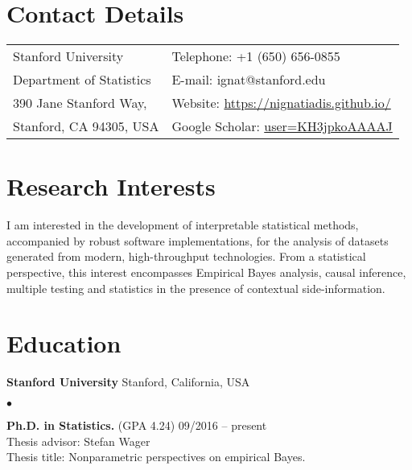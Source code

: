 \documentclass[margin,line]{res}
\newenvironment{list2}{
  \begin{list}{$\bullet$}{%
      \setlength{\itemsep}{0in}
      \setlength{\parsep}{0in} \setlength{\parskip}{0in}
      \setlength{\topsep}{0in} \setlength{\partopsep}{0in}
      \setlength{\leftmargin}{0.2in}}}{\end{list}}
\begin{document}

\begin{resume}
\section{\sc Contact Details}
\vspace{.05in}
\begin{tabular}{@{}p{2in}p{4in}}
Stanford University             & {Telephone:}  +1 (650) 656-0855 \\
Department of Statistics   & {E-mail:}    ignat@stanford.edu \\
390 Jane Stanford Way, &  {Website:} \href{https://nignatiadis.github.io/}{https://nignatiadis.github.io/}\\
Stanford, CA 94305, USA  & {Google Scholar:} \href{https://scholar.google.com/citations?user=KH3jpkoAAAAJ}{user=KH3jpkoAAAAJ} \\
\end{tabular}



\section{\sc Research Interests}
I am interested in the development of interpretable statistical methods, accompanied by robust software implementations, for the analysis of datasets generated from modern, high-throughput technologies. From a statistical perspective, this interest encompasses Empirical Bayes analysis, causal inference, multiple testing and statistics in the presence of contextual side-information.

\section{\sc Education}
{\bf Stanford University} \hfill Stanford, California, USA\\
\vspace*{-.14in}
\begin{list2}
\item
\textbf{Ph.D. in Statistics.}  (GPA 4.24) \hfill  09/2016 -- present\\
Thesis advisor: Stefan Wager\\
Thesis title: Nonparametric perspectives on empirical Bayes.
\end{list2}


\end{resume}
\end{document}
